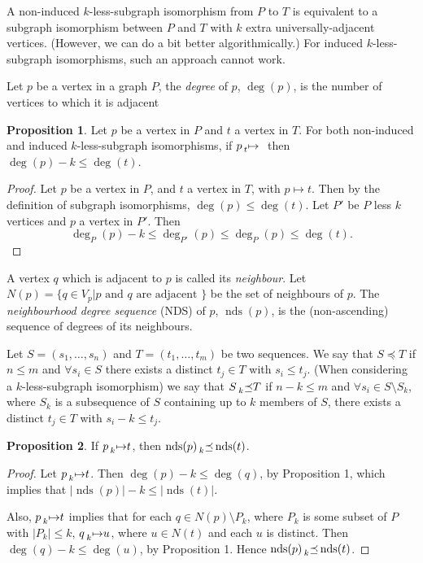 \documentclass[letterpaper]{article}
\theoremstyle{definition}
\newtheorem{proposition}{Proposition}
\newcommand{\nds}{\operatorname{nds}}
\newcommand{\lessmap}[1]{\prescript{}{#1}{\mapsto}\ }
\begin{document}
A non-induced $k$-less-subgraph isomorphism from $P$ to $T$ is equivalent to a subgraph
isomorphism between $P$ and $T$ with $k$ extra universally-adjacent vertices. (However, we can do a
bit better algorithmically.) For induced $k$-less-subgraph isomorphisms, such an approach cannot
work.

Let $p$ be a vertex in a graph $P$, the \emph{degree} of $p$, $\deg(p)$, is the number of vertices
to which it is adjacent

\begin{proposition}
    \label{prop:deg}
    Let $p$ be a vertex in $P$ and $t$ a vertex in $T$. For both non-induced and induced
    $k$-less-subgraph isomorphisms, if $p \lessmap t$ then
    $\deg(p) - k \le \deg(t)$.
\end{proposition}
\begin{proof}
Let $p$ be a vertex in $P$, and $t$ a vertex in $T$, with $p\mapsto t$. Then by the definition of subgraph isomorphisms, $\deg(p) \le \deg(t)$. Let $P'$ be $P$ less $k$ vertices and $p$ a vertex in $P'$. Then
\[
\deg_{P}(p)-k \le \deg_{P'}(p) \le \deg_{P}(p) \le \deg(t).
\]
\end{proof}

A vertex $q$ which is adjacent to $p$ is called its \emph{neighbour}.  Let $N(p) = \{ q \in V_p | p
\text{ and } q \text{ are adjacent }\}$ be the set of neighbours of $p$.  The \emph{neighbourhood
degree sequence} (NDS) of $p$, $\nds(p)$, is the (non-ascending) sequence of degrees of its
neighbours.

Let $S = ( s_1 , \ldots , s_n )$ and $T = ( t_1 , \ldots , t_m)$ be two sequences.  We say that $S
\preceq T$ if $n \leq m$ and $\forall s_i \in S$ there exists a distinct $t_j \in T$ with $s_i \leq
t_j$.  (When considering a $k$-less-subgraph isomorphism) we say that $S \prescript{}{k}{\preceq}
T$ if $n - k \leq m$ and $\forall s_i \in S \setminus S_k$, where $S_k$ is a subsequence of $S$
containing up to $k$ members of $S$, there exists a distinct $t_j \in T$ with $s_i - k \leq t_j$.


\begin{proposition}
If $p \prescript{}{k}{\mapsto} t$, then $\nds(p) \prescript{}{k}{\preceq} \nds(t)$.
\end{proposition}

\begin{proof}
Let $p \prescript{}{k}{\mapsto} t$.  Then $\deg(p) - k \leq \deg(q)$, by Proposition 1, which
implies that $|\nds(p)| -k \leq |\nds(t)|$.

Also, $p \prescript{}{k}{\mapsto} t$ implies that for each $q \in N(p)\setminus P_k$, where $P_k$
is some subset of $P$ with $|P_k| \leq k$, $q \prescript{}{k}{\mapsto} u$, where $u \in N(t)$ and
each $u$ is distinct.  Then $\deg(q) - k \leq \deg(u)$, by Proposition 1.  Hence $\nds(p)
\prescript{}{k}{\preceq} \nds(t)$.
\end{proof}
\end{document}
